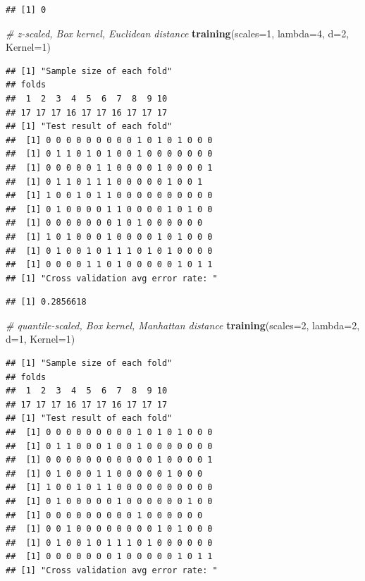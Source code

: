 \documentclass[12pt]{article}
\newenvironment{Shaded}{\begin{snugshade}}{\end{snugshade}}
\newcommand{\AttributeTok}[1]{\textcolor[rgb]{0.13,0.29,0.53}{#1}}
\newcommand{\CommentTok}[1]{\textcolor[rgb]{0.56,0.35,0.01}{\textit{#1}}}
\newcommand{\DecValTok}[1]{\textcolor[rgb]{0.00,0.00,0.81}{#1}}
\newcommand{\FunctionTok}[1]{\textcolor[rgb]{0.13,0.29,0.53}{\textbf{#1}}}
\newcommand{\NormalTok}[1]{#1}
\begin{document}
\begin{verbatim}
## [1] 0
\end{verbatim}

\begin{Shaded}
\begin{Highlighting}[]
\CommentTok{\# z{-}scaled, Box kernel, Euclidean distance}
\FunctionTok{training}\NormalTok{(}\AttributeTok{scales=}\DecValTok{1}\NormalTok{, }\AttributeTok{lambda=}\DecValTok{4}\NormalTok{, }\AttributeTok{d=}\DecValTok{2}\NormalTok{, }\AttributeTok{Kernel=}\DecValTok{1}\NormalTok{)}
\end{Highlighting}
\end{Shaded}

\begin{verbatim}
## [1] "Sample size of each fold"
## folds
##  1  2  3  4  5  6  7  8  9 10 
## 17 17 17 16 17 17 16 17 17 17 
## [1] "Test result of each fold"
##  [1] 0 0 0 0 0 0 0 0 0 1 0 1 0 1 0 0 0
##  [1] 0 1 1 0 1 0 1 0 0 1 0 0 0 0 0 0 0
##  [1] 0 0 0 0 0 1 1 0 0 0 0 1 0 0 0 0 1
##  [1] 0 1 1 0 1 1 1 0 0 0 0 0 1 0 0 1
##  [1] 1 0 0 1 0 1 1 0 0 0 0 0 0 0 0 0 0
##  [1] 0 1 0 0 0 0 1 1 0 0 0 0 1 0 1 0 0
##  [1] 0 0 0 0 0 0 0 1 0 1 0 0 0 0 0 0
##  [1] 1 0 1 0 0 0 1 0 0 0 0 1 0 1 0 0 0
##  [1] 0 1 0 0 1 0 1 1 1 0 1 0 1 0 0 0 0
##  [1] 0 0 0 0 1 1 0 1 0 0 0 0 0 1 0 1 1
## [1] "Cross validation avg error rate: "
\end{verbatim}

\begin{verbatim}
## [1] 0.2856618
\end{verbatim}

\begin{Shaded}
\begin{Highlighting}[]
\CommentTok{\# quantile{-}scaled, Box kernel, Manhattan distance}
\FunctionTok{training}\NormalTok{(}\AttributeTok{scales=}\DecValTok{2}\NormalTok{, }\AttributeTok{lambda=}\DecValTok{2}\NormalTok{, }\AttributeTok{d=}\DecValTok{1}\NormalTok{, }\AttributeTok{Kernel=}\DecValTok{1}\NormalTok{)}
\end{Highlighting}
\end{Shaded}

\begin{verbatim}
## [1] "Sample size of each fold"
## folds
##  1  2  3  4  5  6  7  8  9 10 
## 17 17 17 16 17 17 16 17 17 17 
## [1] "Test result of each fold"
##  [1] 0 0 0 0 0 0 0 0 0 1 0 1 0 1 0 0 0
##  [1] 0 1 1 0 0 0 1 0 0 1 0 0 0 0 0 0 0
##  [1] 0 0 0 0 0 0 0 0 0 0 0 1 0 0 0 0 1
##  [1] 0 1 0 0 0 1 1 0 0 0 0 0 1 0 0 0
##  [1] 1 0 0 1 0 1 1 0 0 0 0 0 0 0 0 0 0
##  [1] 0 1 0 0 0 0 0 1 0 0 0 0 0 0 1 0 0
##  [1] 0 0 0 0 0 0 0 0 0 1 0 0 0 0 0 0
##  [1] 0 0 1 0 0 0 0 0 0 0 0 1 0 1 0 0 0
##  [1] 0 1 0 0 1 0 1 1 1 0 1 0 0 0 0 0 0
##  [1] 0 0 0 0 0 0 0 1 0 0 0 0 0 1 0 1 1
## [1] "Cross validation avg error rate: "
\end{verbatim}
\end{document}

